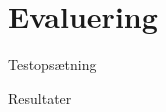 \section{Evaluering}
\begin{frame}{Testopsætning}
\end{frame}

\begin{frame}{Resultater}
\end{frame}